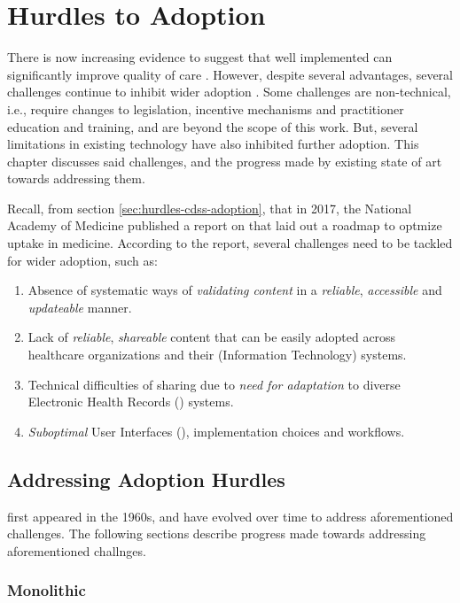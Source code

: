 \chapter{Hurdles to \CDSS{} Adoption}

There is now increasing evidence to suggest that
well implemented \CDSSs{} can significantly improve quality of care
\cite{GargJAMA05,WellsEJPC08}. However, despite several advantages,
several challenges continue to inhibit wider \CDSS{} adoption \cite{Nam17}.
Some challenges are non-technical, i.e., require changes to legislation,
incentive mechanisms and practitioner education and training, and are beyond the
scope of this work. But, several limitations in existing \CDSS{} technology have also
inhibited further adoption. This chapter discusses said challenges, and
the progress made by existing state of art towards addressing them.

Recall, from section \ref{sec:hurdles-cdss-adoption}, that in 2017,
the National Academy of Medicine published a report on \CDSSs{} that
laid out a roadmap to optmize \CDSS{} uptake in medicine. According to the
report, several challenges need to be tackled for wider adoption, such as:


\begin{enumerate}[label=C\arabic*.]
\itemsep0.0em
\item Absence of systematic ways of \emph{validating content}
in a \emph{reliable}, \emph{accessible} and \emph{updateable} manner.
\item Lack of \emph{reliable}, \emph{shareable} \CDSS{} content
that can be easily adopted across healthcare organizations and their (Information
Technology) \IT{} systems.
\item Technical difficulties of sharing due to \emph{need for
  adaptation} to diverse Electronic Health Records (\EHR) systems.
\item \emph{Suboptimal} User Interfaces (\UIs), implementation choices and
workflows.
\end{enumerate}

\section{Addressing Adoption Hurdles}

\CDSS{} first appeared in the 1960s, and have evolved over time
to address aforementioned challenges. The following sections
describe progress made towards addressing aforementioned challnges.

\subsection{Monolithic \CDSSs{}}\label{sec:monolithic-cdss}

